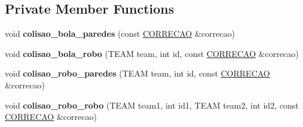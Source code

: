 \subsection*{Private Member Functions}
\begin{DoxyCompactItemize}
\item 
void {\bfseries colisao\+\_\+bola\+\_\+paredes} (const \hyperlink{structCORRECAO}{C\+O\+R\+R\+E\+C\+AO} \&correcao)\hypertarget{classModelo_a9b8714348dab420e56fdeb47dc4028ae}{}\label{classModelo_a9b8714348dab420e56fdeb47dc4028ae}

\item 
void {\bfseries colisao\+\_\+bola\+\_\+robo} (T\+E\+AM team, int id, const \hyperlink{structCORRECAO}{C\+O\+R\+R\+E\+C\+AO} \&correcao)\hypertarget{classModelo_a3b859d16ae979e80629d6d4ef8ed45ff}{}\label{classModelo_a3b859d16ae979e80629d6d4ef8ed45ff}

\item 
void {\bfseries colisao\+\_\+robo\+\_\+paredes} (T\+E\+AM team, int id, const \hyperlink{structCORRECAO}{C\+O\+R\+R\+E\+C\+AO} \&correcao)\hypertarget{classModelo_a7f6ea84c78989452f5b40edfd33315fd}{}\label{classModelo_a7f6ea84c78989452f5b40edfd33315fd}

\item 
void {\bfseries colisao\+\_\+robo\+\_\+robo} (T\+E\+AM team1, int id1, T\+E\+AM team2, int id2, const \hyperlink{structCORRECAO}{C\+O\+R\+R\+E\+C\+AO} \&correcao)\hypertarget{classModelo_af5b48b85ccc2aa6ed4e2ad11888164df}{}\label{classModelo_af5b48b85ccc2aa6ed4e2ad11888164df}

\end{DoxyCompactItemize}
